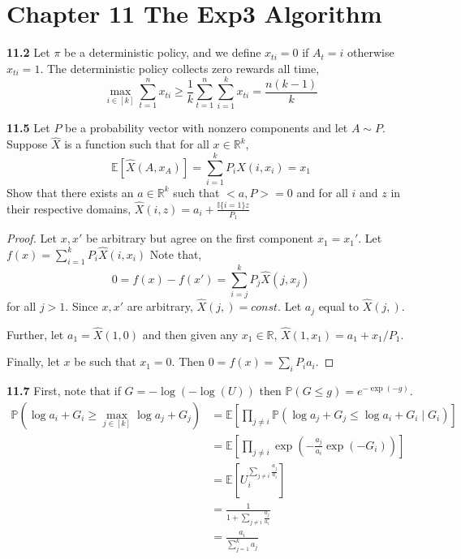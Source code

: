 \chapter*{Chapter 11 The Exp3 Algorithm}
\label{sec:second}

\noindent\textbf{11.2} Let $\pi$ be a deterministic policy, and we define $x_{ti}=0$ if $A_t=i$ otherwise $x_{ti}=1$. The deterministic policy collects zero rewards all time,
\begin{equation}
    \max _{i \in[k]} \sum_{t=1}^{n} x_{t i} \geq \frac{1}{k} \sum_{t=1}^{n} \sum_{i=1}^{k} x_{t i}=\frac{n(k-1)}{k}
\end{equation}

\noindent\textbf{11.5} Let $P$ be a probability vector with nonzero components and let $A\sim P$. Suppose $\hat{X}$ is a function such that for all $x\in \mathbb{R}^k$,
\begin{equation}
    \mathbb{E}\left[\hat{X}\left(A, x_{A}\right)\right]=\sum_{i=1}^{k} P_{i} \hat{X}\left(i, x_{i}\right)=x_{1}
\end{equation}
Show that there exists an $a\in \mathbb{R}^k$ such that $<a,P>=0$ and for all $i$ and $z$ in their respective domains, $\hat{X}(i, z)=a_{i}+\frac{\mathbb{I}\{i=1\} z}{P_{1}}$
\begin{proof}
    Let $x, x'$ be arbitrary but agree on the first component $x_1=x_1'$. Let $f(x)=\sum_{i=1}^{k} P_{i} \hat{X}\left(i, x_{i}\right)$ Note that,
    \begin{equation}
        0=f(x)-f(x')=\sum_{i=j}^{k} P_{j} \hat{X}\left(j, x_{j}\right)
    \end{equation}
    for all $j>1$. Since $x, x'$ are arbitrary, $\hat{X}(j, )=const$. Let $a_j$ equal to $\hat{X}(j, )$.
    \par Further, let $a_1=\hat{X}(1, 0)$ and then given any $x_1\in \mathbb{R}$, $\hat{X}\left(1, x_{1}\right)=a_{1}+x_{1} / P_{1}$.
    \par Finally, let $x$ be such that $x_1=0$. Then $0=f(x)=\sum_{i} P_{i} a_{i}$.
\end{proof}

\noindent\textbf{11.7} First, note that if $G=-\log (-\log (U))$ then $\mathbb{P}(G \leq g)=e^{-\exp (-g)}$.
\begin{equation}
    \begin{aligned}
        \mathbb{P}\left(\log a_{i}+G_{i} \geq \max _{j \in[k]} \log a_{j}+G_{j}\right) &=\mathbb{E}\left[\prod_{j \neq i} \mathbb{P}\left(\log a_{j}+G_{j} \leq \log a_{i}+G_{i} \mid G_{i}\right)\right] \\
        &=\mathbb{E}\left[\prod_{j \neq i} \exp \left(-\frac{a_{j}}{a_{i}} \exp \left(-G_{i}\right)\right)\right] \\
        &=\mathbb{E}\left[U_{i}^{\sum_{j \neq i} \frac{a_{j}}{a_{i}}}\right] \\
        &=\frac{1}{1+\sum_{j \neq i} \frac{a_{j}}{a_{i}}} \\
        &=\frac{a_{i}}{\sum_{j=1}^{k} a_{j}}
        \end{aligned}
\end{equation}

